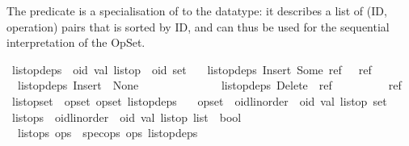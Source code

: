 \noindent The  predicate is a specialisation of  to the  datatype: it describes a list of (ID, operation) pairs that is sorted by ID, and can thus be used for the sequential interpretation of the OpSet.

\begin{isabelle}
\isamarkupfalse%
\ list{\isacharunderscore}op{\isacharunderscore}deps\ {\isacharcolon}{\isacharcolon}\ {\isachardoublequoteopen}{\isacharparenleft}{\isacharprime}oid{\isacharcomma}\ {\isacharprime}val{\isacharparenright}\ list{\isacharunderscore}op\ {\isasymRightarrow}\ {\isacharprime}oid\ set{\isachardoublequoteclose}\ \isanewline
\ \ {\isachardoublequoteopen}list{\isacharunderscore}op{\isacharunderscore}deps\ {\isacharparenleft}Insert\ {\isacharparenleft}Some\ ref{\isacharparenright}\ {\isacharunderscore}{\isacharparenright}\ {\isacharequal}\ {\isacharbraceleft}ref{\isacharbraceright}{\isachardoublequoteclose}\ {\isacharbar}\isanewline
\ \ {\isachardoublequoteopen}list{\isacharunderscore}op{\isacharunderscore}deps\ {\isacharparenleft}Insert\ \ None\ \ \ \ \ \ {\isacharunderscore}{\isacharparenright}\ {\isacharequal}\ {\isacharbraceleft}{\isacharbraceright}{\isachardoublequoteclose}\ \ \ \ {\isacharbar}\isanewline
\ \ {\isachardoublequoteopen}list{\isacharunderscore}op{\isacharunderscore}deps\ {\isacharparenleft}Delete\ \ ref\ \ \ \ \ \ \ \ {\isacharparenright}\ {\isacharequal}\ {\isacharbraceleft}ref{\isacharbraceright}{\isachardoublequoteclose}\isanewline
\isanewline
{}\isamarkupfalse%
\ list{\isacharunderscore}opset\ {\isacharequal}\ opset\ opset\ list{\isacharunderscore}op{\isacharunderscore}deps\isanewline
\ \ \ opset\ {\isacharcolon}{\isacharcolon}\ {\isachardoublequoteopen}{\isacharparenleft}{\isacharprime}oid{\isacharcolon}{\isacharcolon}{\isacharbraceleft}linorder{\isacharbraceright}\ {\isasymtimes}\ {\isacharparenleft}{\isacharprime}oid{\isacharcomma}\ {\isacharprime}val{\isacharparenright}\ list{\isacharunderscore}op{\isacharparenright}\ set{\isachardoublequoteclose}\isanewline
\isanewline
{}\isamarkupfalse%
\ list{\isacharunderscore}ops\ {\isacharcolon}{\isacharcolon}\ {\isachardoublequoteopen}{\isacharparenleft}{\isacharprime}oid{\isacharcolon}{\isacharcolon}{\isacharbraceleft}linorder{\isacharbraceright}\ {\isasymtimes}\ {\isacharparenleft}{\isacharprime}oid{\isacharcomma}\ {\isacharprime}val{\isacharparenright}\ list{\isacharunderscore}op{\isacharparenright}\ list\ {\isasymRightarrow}\ bool{\isachardoublequoteclose}\ \isanewline
\ \ {\isachardoublequoteopen}list{\isacharunderscore}ops\ ops\ {\isasymequiv}\ spec{\isacharunderscore}ops\ ops\ list{\isacharunderscore}op{\isacharunderscore}deps{\isachardoublequoteclose}%
\end{isabelle}

